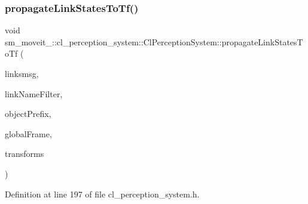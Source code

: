 \subsubsection{\texorpdfstring{propagate\+Link\+States\+To\+Tf()}{propagateLinkStatesToTf()}}
{\footnotesize\ttfamily void sm\+\_\+moveit\+\_\+::cl\+\_\+perception\+\_\+system\+::\+Cl\+Perception\+System\+::propagate\+Link\+States\+To\+Tf (\begin{DoxyParamCaption}\item[{const gazebo\+\_\+msgs\+::\+Link\+States \&}]{linksmsg,  }\item[{std\+::string}]{link\+Name\+Filter,  }\item[{std\+::string}]{object\+Prefix,  }\item[{std\+::string}]{global\+Frame,  }\item[{std\+::vector$<$ tf\+::\+Stamped\+Transform $>$ \&}]{transforms }\end{DoxyParamCaption})\hspace{0.3cm}{\ttfamily [inline]}}



Definition at line 197 of file cl\+\_\+perception\+\_\+system.\+h.


